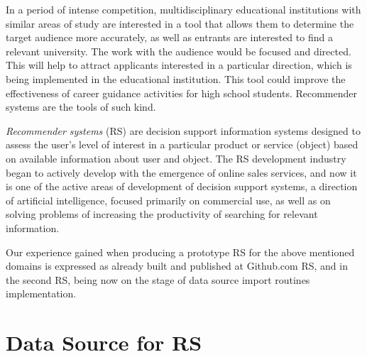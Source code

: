 \documentclass[conference,a4]{IEEEtran}
\begin{document}


In a period of intense competition, multidisciplinary educational institutions with similar areas of study are interested in a tool that allows them to determine the target audience more accurately, as well as entrants are interested to find a relevant university.  The work with the audience would be focused and directed. This will help to attract applicants interested in a particular direction, which is being implemented in the educational institution.  This tool could improve the effectiveness of career guidance activities for high school students.  Recommender systems are the tools of such kind.

\emph{Recommender systems} (RS) \cite{rs_basics} are decision support information systems designed to assess the user's level of interest in a particular product or service (object) based on available information about user and object.  The RS development industry began to actively develop with the emergence of online sales services, and now it is one of the active areas of development of decision support systems, a direction of artificial intelligence, focused primarily on commercial use, as well as on solving problems of increasing the productivity of searching for relevant information.

Our experience gained when producing a prototype RS for the above mentioned domains is expressed as already built and published at Github.com \cite{RSPO} RS, and in the second RS, being now on the stage of data source import routines implementation.

\section{Data Source for RS}
\end{document}
